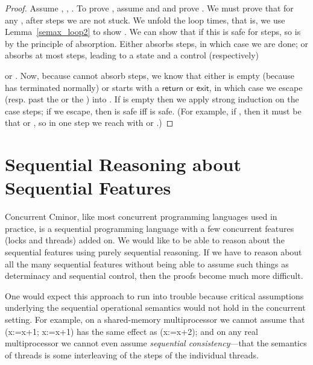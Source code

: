 \documentclass{llncs}
\newcommand{\cminor}{Cminor}
\newcommand{\tyface}[1]{\ensuremath{\mathsf{#1}}}
\begin{document}
\begin{theorem}
\label{semax_loop1}

\begin{proof}
Assume , , 
.
To prove ,
assume  and  and prove
.
We must prove that for any , after  steps we are not stuck.
We unfold the loop  times, that is,
we use Lemma~\ref{semax_loop2} to show
.
We can show that if this is safe for  steps,
so is  by the principle of 
absorption.  Either  absorbs  steps, in which case we are done;
or  absorbs at most  steps, leading to a state 
and a control (respectively)

or 
.
Now, because  cannot absorb  steps,
we know that either  is empty
(because  has terminated normally) or
 starts with a \tyface{return} or \tyface{exit},
in which case we escape (resp. past the 
or the ) into .
If  is empty then we apply strong induction
on the case  steps; if we escape, then 
 is safe iff 
 is safe.
(For example, if , then it must be that  or , 
so in one step we reach 
with  or .)

\end{proof}
\end{theorem}














\section{Sequential Reasoning about Sequential Features}

Concurrent \cminor, like most concurrent programming languages
used in practice, is a sequential programming language
with a few concurrent features (locks and threads)
added on.  We would like to be able to reason about the sequential
features using purely sequential reasoning.   If we have to
reason about all the many sequential features without being
able to assume such things as determinacy and sequential control, then
the proofs become much more difficult.

One would expect this approach to run into trouble because
critical assumptions underlying the sequential operational
semantics would not hold in the concurrent setting.
For example, on a shared-memory multiprocessor we cannot
assume that (x:=x+1; x:=x+1) has the same effect as
(x:=x+2); and on any real multiprocessor 
we cannot even assume \emph{sequential consistency}---that the
semantics of  threads is some interleaving of the steps
of the individual threads.
\end{document}

